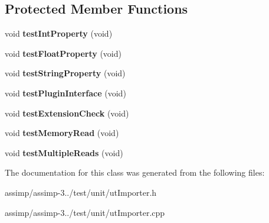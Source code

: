 \subsection*{Protected Member Functions}
\begin{DoxyCompactItemize}
\item 
\hypertarget{class_importer_test_a35c24220ce7c3a3b500fca67206ff513}{void {\bfseries test\+Int\+Property} (void)}\label{class_importer_test_a35c24220ce7c3a3b500fca67206ff513}

\item 
\hypertarget{class_importer_test_a8b6b865edf966e101673a3d62a7fa2d0}{void {\bfseries test\+Float\+Property} (void)}\label{class_importer_test_a8b6b865edf966e101673a3d62a7fa2d0}

\item 
\hypertarget{class_importer_test_a7820cd4af8bf7a48293c1149bc8c0422}{void {\bfseries test\+String\+Property} (void)}\label{class_importer_test_a7820cd4af8bf7a48293c1149bc8c0422}

\item 
\hypertarget{class_importer_test_acd1e78ef7c84a031ceb7427c0c37899d}{void {\bfseries test\+Plugin\+Interface} (void)}\label{class_importer_test_acd1e78ef7c84a031ceb7427c0c37899d}

\item 
\hypertarget{class_importer_test_ad114f2a6fe44402e45aa4bfedc5fa33c}{void {\bfseries test\+Extension\+Check} (void)}\label{class_importer_test_ad114f2a6fe44402e45aa4bfedc5fa33c}

\item 
\hypertarget{class_importer_test_a45b5671f083927efaeface74ecd704bf}{void {\bfseries test\+Memory\+Read} (void)}\label{class_importer_test_a45b5671f083927efaeface74ecd704bf}

\item 
\hypertarget{class_importer_test_a9123510115c4fdcc903c05abc2265408}{void {\bfseries test\+Multiple\+Reads} (void)}\label{class_importer_test_a9123510115c4fdcc903c05abc2265408}

\end{DoxyCompactItemize}


The documentation for this class was generated from the following files\+:\begin{DoxyCompactItemize}
\item 
assimp/assimp-\/3../test/unit/ut\+Importer.\+h\item 
assimp/assimp-\/3../test/unit/ut\+Importer.\+cpp\end{DoxyCompactItemize}
